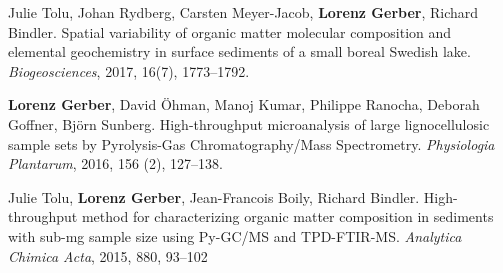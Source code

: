\documentclass[10pt]{article}
\begin{document}
\begin{bibenum}
                                                                                           \item Julie Tolu, Johan Rydberg, Carsten Meyer-Jacob,
                                                                                             \textbf{Lorenz Gerber}, Richard Bindler. Spatial variability of
                                                                                             organic matter molecular composition and elemental geochemistry
                                                                                             in surface sediments of a small boreal Swedish lake.
                                                                                             \textit{Biogeosciences}, 2017, 16(7), 1773--1792.

                                                                                           \item \textbf{Lorenz Gerber}, David \"{O}hman, Manoj Kumar, Philippe
                                                                                             Ranocha, Deborah Goffner, Bj\"{o}rn Sunberg. High-throughput
                                                                                             microanalysis of large lignocellulosic sample sets by
                                                                                             Pyrolysis-Gas Chromatography/Mass
                                                                                             Spectrometry. \textit{Physiologia Plantarum},
                                                                                             2016, 156 (2), 127--138.


                                                                                           \item Julie Tolu, \textbf{Lorenz Gerber}, Jean-Francois Boily,
                                                                                             Richard Bindler. High-throughput method for characterizing
                                                                                             organic matter composition in sediments with sub-mg sample
                                                                                             size using Py-GC/MS and TPD-FTIR-MS. \textit{Analytica Chimica
                                                                                               Acta}, 2015, 880, 93--102\\



\end{bibenum}
\end{document}
